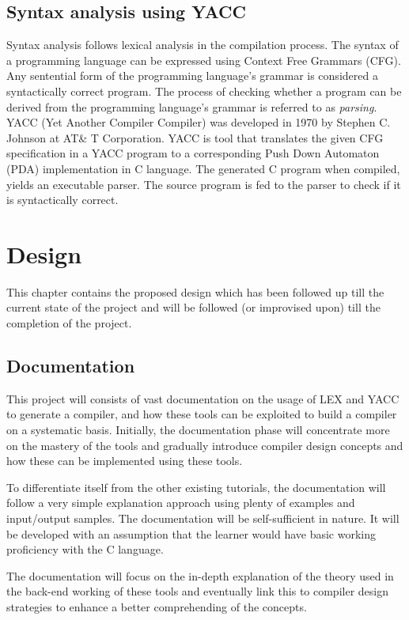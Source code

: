 \section{Syntax analysis using YACC}
Syntax analysis follows lexical analysis in the compilation process. The syntax of a programming language can be expressed using Context Free Grammars (CFG). Any sentential form of the programming language's grammar is considered a syntactically correct program. The process of checking whether a program can be derived from the programming language's grammar is referred to as \textit{parsing}. 
YACC (Yet Another Compiler Compiler) was developed in 1970 by Stephen C. Johnson at AT\& T  Corporation. YACC is tool that translates the given CFG specification in a YACC program to a corresponding Push Down Automaton (PDA) implementation in C language. The generated C program when compiled, yields an executable parser. The source program is fed to the parser to check if it is syntactically correct. 

\chapter{Design}

This chapter contains the proposed design which has been followed up till the current state of the project and will be followed (or improvised upon) till the completion of the project.
\section{Documentation}

This project will consists of vast documentation on the usage of LEX and YACC to generate a compiler, and how these tools can be exploited to build a compiler on a systematic basis. Initially, the documentation phase will concentrate more on the mastery of the tools and gradually introduce compiler design concepts and how these can be implemented using these tools.

To differentiate itself from the other existing tutorials, the documentation will follow a very simple explanation approach using plenty of examples and input/output samples. The documentation will be self-sufficient in nature. It will be developed with an assumption that the learner would have basic working proficiency with the C language.

The documentation will focus on the in-depth explanation of the theory used in the back-end working of these tools and eventually link this to compiler design strategies to enhance a better comprehending of the concepts.

